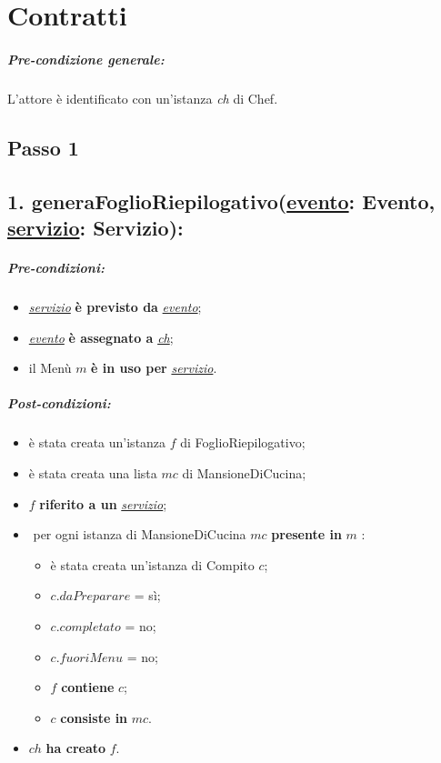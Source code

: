 \chapter{Contratti}

\paragraph{Pre-condizione generale:} L'attore è identificato con un'istanza \textit{ch} di Chef. 

\section{Passo 1}

\section*{1. generaFoglioRiepilogativo(\underline{evento}: Evento, \underline{servizio}: Servizio):}

\paragraph{Pre-condizioni:}

\begin{itemize}
  \item \underline{\textit{servizio}} \textbf{è previsto da} \underline{\textit{evento}};
  \item \underline{\textit{evento}} \textbf{è assegnato a} \underline{\textit{ch}};
  \item il Menù $m$ \textbf{è in uso per} \underline{\textit{servizio}}.
\end{itemize}

\paragraph{Post-condizioni:}

\begin{itemize}
  \item è stata creata un'istanza $f$ di FoglioRiepilogativo;
  \item è stata creata una lista $mc$ di MansioneDiCucina;
  \item $f$ \textbf{riferito a un} \underline{\textit{servizio}};
  \item \textlangle $ $ per ogni istanza di MansioneDiCucina $mc$ \textbf{presente in} $m$ \textrangle:
    \begin{itemize}
      \item è stata creata un'istanza di Compito $c$;
      \item $c.daPreparare$ = sì;
      \item $c.completato$ = no;
      \item $c.fuoriMenu$ = no;
      \item $f$ \textbf{contiene} $c$;
      \item $c$ \textbf{consiste in} $mc$.
    \end{itemize}
  \item $ch$ \textbf{ha creato} $f$. 
\end{itemize}


